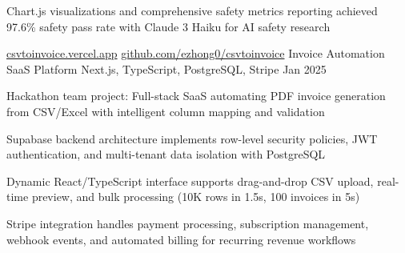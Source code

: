 \documentclass[12pt, letterpaper]{russell}
\begin{document}
\begin{cventries}
{\begin{cvitems}
        \item {Chart.js visualizations and comprehensive safety metrics reporting achieved 97.6\% safety pass rate with Claude 3 Haiku for AI safety research}
      \end{cvitems}
    }
\cvprojectinline
    {\href{https://csvtoinvoice.vercel.app}{csvtoinvoice.vercel.app} \textbar{} \href{https://github.com/ezhong0/csvtoinvoice}{github.com/ezhong0/csvtoinvoice}} %
    {Invoice Automation SaaS Platform} %
    {Next.js, TypeScript, PostgreSQL, Stripe} %
    {Jan 2025} %
    {
      \begin{cvitems}
        \item {Hackathon team project: Full-stack SaaS automating PDF invoice generation from CSV/Excel with intelligent column mapping and validation}
        \item {Supabase backend architecture implements row-level security policies, JWT authentication, and multi-tenant data isolation with PostgreSQL}
        \item {Dynamic React/TypeScript interface supports drag-and-drop CSV upload, real-time preview, and bulk processing (10K rows in 1.5s, 100 invoices in 5s)}
        \item {Stripe integration handles payment processing, subscription management, webhook events, and automated billing for recurring revenue workflows}
      \end{cvitems}
    }
\end{cventries}
\vspace{-0.25cm}
\end{document}
